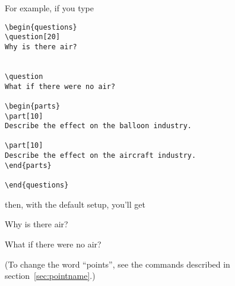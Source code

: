 \documentclass[12pt]{exam}
\begin{document}
For example, if you type
\begin{verbatim}
\begin{questions}
\question[20]
Why is there air?


\question
What if there were no air?

\begin{parts}
\part[10]
Describe the effect on the balloon industry.

\part[10]
Describe the effect on the aircraft industry.
\end{parts}

\end{questions}
\end{verbatim}
then, with the default setup, you'll get
\nopointsinmargin
\begin{questions}
\question[20]
Why is there air?


\question
What if there were no air?


\end{questions}
(To change the word ``points'', see the commands described in
section~\ref{sec:pointname}.)
\end{document}
